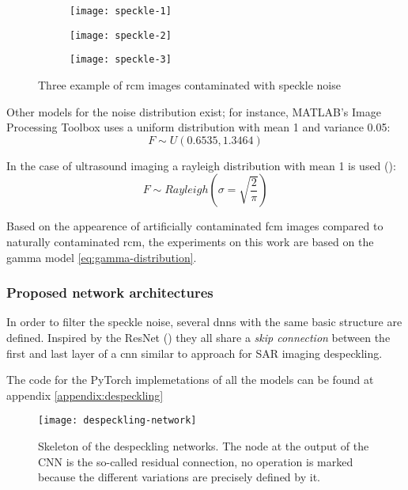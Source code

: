 \documentclass[../main.tex]{subfiles}
\begin{document}
\begin{figure}[h]
\centering
\begin{subfigure}{.3\textwidth}
  \centering
  \texttt{[image: speckle-1]}
\end{subfigure}%
\begin{subfigure}{.3\textwidth}
  \centering
  \texttt{[image: speckle-2]}
\end{subfigure}%
\begin{subfigure}{.3\textwidth}
  \centering
  \texttt{[image: speckle-3]}
\end{subfigure}
\caption{Three example of \gls{rcm} images contaminated with speckle noise}
\label{fig:speckle}
\end{figure}

Other models for the noise distribution exist; for instance, MATLAB's
Image Processing Toolbox uses a uniform distribution with mean 1 and
variance 0.05:
\begin{equation}
F \sim U(0.6535,1.3464)
\end{equation}

In the case of ultrasound imaging a rayleigh distribution with mean 1 is used
(\cite{RayleighSpeckle}):
\begin{equation}
F \sim Rayleigh(\sigma=\sqrt{\frac{2}{\pi}})
\end{equation}

Based on the appearence of artificially contaminated \gls{fcm} images compared to
naturally contaminated \gls{rcm}, the experiments on this work are based on the
gamma model \eqref{eq:gamma-distribution}.

\subsubsection{Proposed network architectures}
In order to filter the speckle noise, several \glspl{dnn} with the same basic
structure are defined. Inspired by the ResNet (\cite{he2015deep}) they all share a
\emph{skip connection} between the first and last layer of a \gls{cnn} similar to
\cite{Wang2018} approach for SAR imaging despeckling.

The code for the PyTorch implemetations of all the models can be found at
appendix \ref{appendix:despeckling}

\begin{figure}[H]
\centering
\texttt{[image: despeckling-network]}
\caption{Skeleton of the despeckling networks. The node at the output of the
CNN is the so-called residual connection, no operation is marked because
the different variations are precisely defined by it.}
\label{fig:despeckling-network}
\end{figure}
\end{document}
